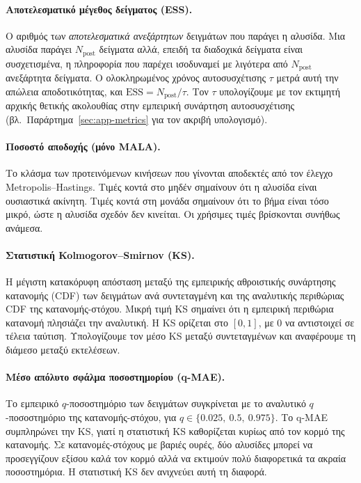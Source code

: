 \paragraph{Αποτελεσματικό μέγεθος δείγματος (ESS).}
Ο αριθμός των \emph{αποτελεσματικά ανεξάρτητων} δειγμάτων που παράγει η
αλυσίδα. Μια αλυσίδα παράγει $N_{\text{post}}$ δείγματα αλλά, επειδή τα
διαδοχικά δείγματα είναι συσχετισμένα, η πληροφορία που παρέχει
ισοδυναμεί με λιγότερα από $N_{\text{post}}$
ανεξάρτητα δείγματα. Ο ολοκληρωμένος χρόνος αυτοσυσχέτισης $\tau$ μετρά
αυτή την απώλεια αποδοτικότητας, και $\text{ESS} = N_{\text{post}} / \tau$.
Τον $\tau$ υπολογίζουμε με τον εκτιμητή αρχικής θετικής ακολουθίας
στην εμπειρική συνάρτηση αυτοσυσχέτισης (βλ.\ Παράρτημα~\ref{sec:app-metrics} για τον ακριβή υπολογισμό).


\paragraph{Ποσοστό αποδοχής (μόνο MALA).}
Το κλάσμα των προτεινόμενων κινήσεων που γίνονται αποδεκτές από τον έλεγχο
Metropolis--Hastings. Τιμές κοντά στο μηδέν σημαίνουν ότι η αλυσίδα είναι
ουσιαστικά ακίνητη. Τιμές κοντά στη μονάδα σημαίνουν ότι το βήμα είναι
τόσο μικρό, ώστε η αλυσίδα σχεδόν δεν κινείται. Οι χρήσιμες τιμές βρίσκονται
συνήθως ανάμεσα.

\paragraph{Στατιστική Kolmogorov--Smirnov (KS).}
Η μέγιστη κατακόρυφη απόσταση μεταξύ της εμπειρικής αθροιστικής συνάρτησης
κατανομής (CDF) των δειγμάτων ανά συντεταγμένη και της αναλυτικής
περιθώριας CDF της κατανομής-στόχου. Μικρή τιμή KS σημαίνει ότι η εμπειρική
περιθώρια κατανομή πλησιάζει την αναλυτική. Η KS ορίζεται στο
$[0, 1]$, με $0$ να αντιστοιχεί σε τέλεια ταύτιση. Υπολογίζουμε τον
μέσο KS μεταξύ συντεταγμένων και αναφέρουμε τη διάμεσο μεταξύ εκτελέσεων.

\paragraph{Μέσο απόλυτο σφάλμα ποσοστημορίου (q-MAE).}
Το εμπειρικό $q$-ποσοστημόριο των δειγμάτων συγκρίνεται με το αναλυτικό
$q$-ποσοστημόριο της κατανομής-στόχου, για $q \in \{0.025,\allowbreak\ 0.5,\allowbreak\ 0.975\}$.
Το q-MAE συμπληρώνει την KS, γιατί η στατιστική KS
καθορίζεται κυρίως από τον κορμό της κατανομής. Σε κατανομές-στόχους με βαριές
ουρές, δύο αλυσίδες μπορεί να προσεγγίζουν εξίσου καλά τον κορμό αλλά να
εκτιμούν πολύ διαφορετικά τα ακραία ποσοστημόρια.
Η στατιστική KS δεν ανιχνεύει αυτή τη διαφορά.

